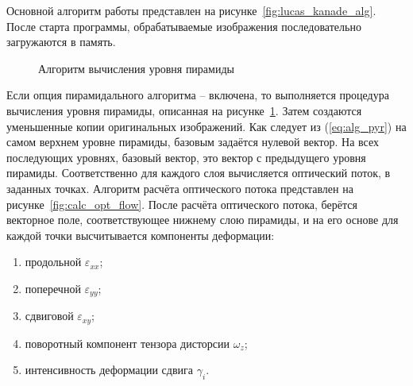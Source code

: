 Основной алгоритм работы представлен на рисунке~\ref{fig:lucas_kanade_alg}. После старта программы, обрабатываемые изображения последовательно загружаются в память.
\begin{figure}[h!]
\caption{Алгоритм вычисления уровня пирамиды}
\label{fig:calc_pyr}
\end{figure}
Если опция пирамидального алгоритма -- включена, то выполняется процедура вычисления уровня пирамиды, описанная на рисунке~\ref{fig:calc_pyr}. Затем создаются уменьшенные копии оригинальных изображений.
Как следует из (\ref{eq:alg_pyr}) на самом верхнем уровне пирамиды, базовым задаётся нулевой вектор. На всех последующих уровнях, базовый вектор, это вектор с предыдущего уровня пирамиды.
Соответственно для каждого слоя вычисляется оптический поток, в заданных точках. Алгоритм расчёта оптического потока представлен на рисунке~\ref{fig:calc_opt_flow}. 
После расчёта оптического потока, берётся векторное поле, соответствующее нижнему слою пирамиды, и на его основе для каждой точки высчитывается компоненты деформации:
\begin{enumerate}
\item продольной $\varepsilon_{xx}$;
\item поперечной $\varepsilon_{yy}$;
\item сдвиговой $\varepsilon_{xy}$;
\item поворотный компонент тензора дисторсии $\omega_z$;
\item интенсивность деформации сдвига $\gamma_i$.
\end{enumerate}

